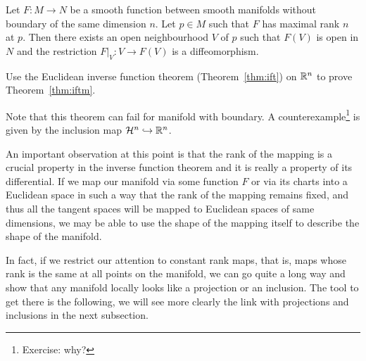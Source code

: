 \begin{theorem}\label{thm:iftm}
	Let $F:M\to N$ be a smooth function between smooth manifolds without boundary of the same dimension $n$.
	Let $p\in M$ such that $F$ has maximal rank $n$ at $p$.
	Then there exists an open neighbourhood $V$ of $p$ such that $F(V)$ is open in $N$ and the restriction $F|_V : V\to F(V)$ is a diffeomorphism.
\end{theorem}
\begin{exercise}
	Use the Euclidean inverse function theorem (Theorem~\ref{thm:ift}) on $\mathbb{R}^n$ to prove Theorem~\ref{thm:iftm}.
\end{exercise}

Note that this theorem can fail for manifold with boundary.
A counterexample\footnote{Exercise: why?} is given by the inclusion map $\mathcal{H}^n \hookrightarrow \mathbb{R}^n$.

An important observation at this point is that the rank of the mapping
is a crucial property in the inverse function theorem and it is really a
property of its differential.
If we map our manifold via some function $F$ or via its charts into a
Euclidean space in such a way that the rank of the mapping remains fixed,
and thus all the tangent spaces will be mapped to Euclidean spaces of same dimensions,
we may be able to use the shape of the mapping itself to describe the
shape of the manifold.

In fact, if we restrict our attention to constant rank maps, that is,
maps whose rank is the same at all points on the manifold, we can go quite a
long way and show that any manifold locally looks like a projection or an inclusion.
The tool to get there is the following, we will see more clearly the link with
projections and inclusions in the next subsection.

